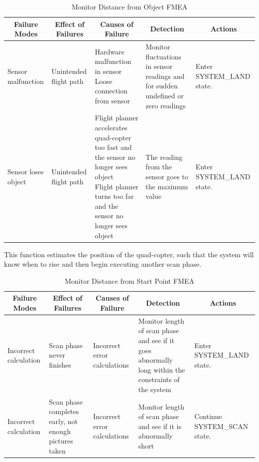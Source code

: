 \documentclass[10pt,letterpaper]{article}
\newcommand{\fmeaheader}{\multicolumn{1}{c}{\textbf{Failure Modes}} & \multicolumn{1}{c}{\textbf{Effect of Failures}} & \multicolumn{1}{c}{\textbf{Causes of Failure}} & \multicolumn{1}{c}{\textbf{Detection}} & \multicolumn{1}{c}{\textbf{Actions}}}
\begin{document}
\begin{table}[H]
\footnotesize  
	\begin{adjustwidth}{-1.8in}{-1.8in}  
      \begin{center}
          \begin{tabular}{|p{3cm}p{3cm}p{3cm}p{3cm}p{4.5cm}|}          
              \fmeaheader \\ \hline
              Sensor malfunction & 
              Unintended flight path & 
              \parbox[t]{3cm}{Hardware malfunction in sensor\\ Loose connection from sensor} &
              Monitor fluctuations in sensor readings and for sudden undefined or zero readings  & 
              Enter SYSTEM\_LAND state. \\ \hline 
              
              Sensor loses object & 
              Unintended flight path & 
              \parbox[t]{3cm}{Flight planner accelerates quad-copter too fast and the sensor no longer sees object \\ Flight planner turns too far and the sensor no longer sees object} &
              The reading from the sensor goes to the maximum value &
              Enter SYSTEM\_LAND state. \\ \hline 
          \end{tabular}
      \end{center}
      \caption[Monitor Distance from Object FMEA]{Monitor Distance from Object FMEA}
    \end{adjustwidth}
\end{table}

\newpage 

This function estimates the position of the quad-copter, such that the system will know when to rise and then begin executing another scan phase.
\begin{table}[H]
\footnotesize  
	\begin{adjustwidth}{-1.8in}{-1.8in}  
      \begin{center}
          \begin{tabular}{|p{3cm}p{3cm}p{3cm}p{3cm}p{4.5cm}|}
              \fmeaheader \\ \hline
              Incorrect calculation & 
              Scan phase never finishes & 
              Incorrect error calculations &
              Monitor length of scan phase and see if it goes abnormally long within the constraints of the system &
              Enter SYSTEM\_LAND state. \\ \hline 
              Incorrect calculation & 
              Scan phase completes early, not enough pictures taken & 
              Incorrect error calculations &
              Monitor length of scan phase and see if it is abnormally short&
              Continue SYSTEM\_SCAN state. \\ \hline 
          \end{tabular}
      \end{center}
      \caption[Monitor Distance from Start Point FMEA]{Monitor Distance from Start Point FMEA}
    \end{adjustwidth}
\end{table}
\end{document}
